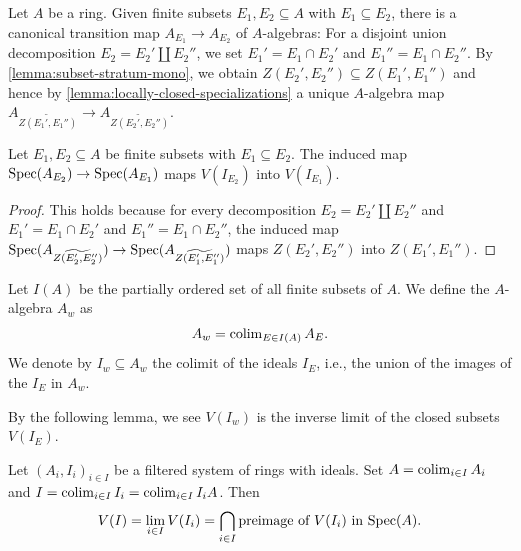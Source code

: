 Let $A$ be a ring. Given finite subsets $E_1, E_2 \subseteq A$ with $E_1 \subseteq E_2$, there is a
canonical transition map $A_{E_1} \to A_{E_2}$ of $A$-algebras: For
a disjoint union decomposition $E_2 = E_2' \coprod E_2''$, we set
$E_1' = E_1 \cap E_2'$ and $E_1'' = E_1 \cap E_2''$. By \ref{lemma:subset-stratum-mono},
we obtain $Z(E_2', E_2'') \subseteq Z(E_1', E_1'')$ and hence
by \ref{lemma:locally-closed-specializations} a unique $A$-algebra map
$A_{\widetilde{Z(E_1', E_1'')}} \to A_{\widetilde{Z(E_2', E_2'')}}$.

\begin{lemma}
    Let $E_1, E_2 \subseteq A$ be finite subsets with $E_1 \subseteq E_2$.
    The induced map $\mathrm{Spec}(A_{E_2}) \to \mathrm{Spec}(A_{E_1})$ maps
    $V(I_{E_2})$ into $V(I_{E_1})$.
    \label{lemma:finite-stratification-map-closed}
    \leanok
\end{lemma}

\begin{proof}
    \leanok
    This holds because for every decomposition $E_2 = E_2' \coprod E_2''$
    and $E_1' = E_1 \cap E_2'$ and $E_1'' = E_1 \cap E_2''$, the induced map
    $\mathrm{Spec}(A_{\widetilde{Z(E_2', E_2'')}}) \to \mathrm{Spec}(A_{\widetilde{Z(E_1', E_1'')}})$
    maps $Z(E_2', E_2'')$ into $Z(E_1', E_1'')$.
\end{proof}

\begin{definition}
    Let $I(A)$ be the partially ordered set of all finite subsets of $A$. We define the
    $A$-algebra $A_{w}$ as
    \[
    A_w = \operatorname{colim}_{E \in I(A)} A_E
    .\]
    We denote by $I_w \subseteq A_w$ the colimit of the ideals $I_E$, i.e.,
    the union of the images of the $I_E$ in $A_w$.%
    \label{def:w-localization}
    \leanok
\end{definition}

By the following lemma, we see $V(I_w)$ is the inverse limit of the closed subsets $V(I_E)$.
\begin{lemma}
  \label{thm:colim-ideal-lim-zero-locus}
    Let $(A_i, I_i)_{i \in I}$ be a filtered system of
    rings with ideals. Set $A = \operatorname{colim}_{i \in I} A_i$ and
    $I = \operatorname{colim}_{i \in I} I_i = \operatorname{colim}_{i \in I} I_i A$. Then
    \[
    V(I) = \lim_{i \in I} V(I_i) = \bigcap_{i \in I} \text{preimage of } V(I_i) \text{ in } \mathrm{Spec}(A)
    .\]
  \leanok
\end{lemma}

